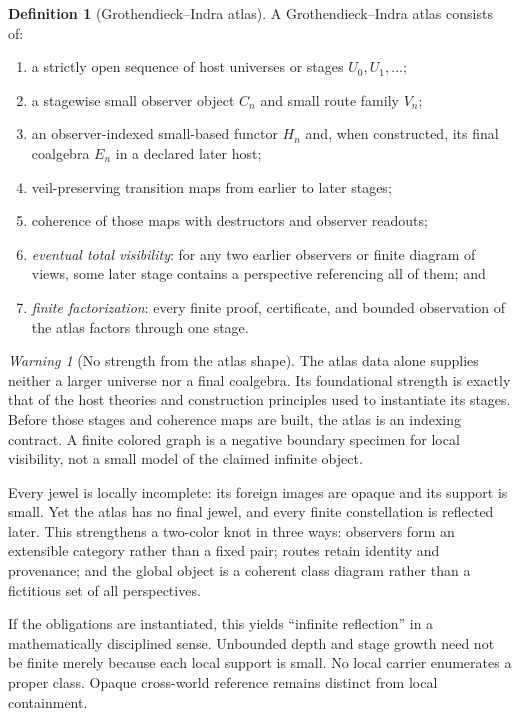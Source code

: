 \documentclass[11pt]{article}
\theoremstyle{definition}
\newtheorem{definition}[theorem]{Definition}
\theoremstyle{remark}
\newtheorem{warning}[theorem]{Warning}
\begin{document}
\begin{definition}[Grothendieck--Indra atlas]
A Grothendieck--Indra atlas consists of:
\begin{enumerate}[label=(\alph*)]
\item a strictly open sequence of host universes or stages $U_0,U_1,\ldots$;
\item a stagewise small observer object $C_n$ and small route family $V_n$;
\item an observer-indexed small-based functor $H_n$ and, when constructed, its
  final coalgebra $E_n$ in a declared later host;
\item veil-preserving transition maps from earlier to later stages;
\item coherence of those maps with destructors and observer readouts;
\item \emph{eventual total visibility}: for any two earlier observers or finite
  diagram of views, some later stage contains a perspective referencing all of
  them; and
\item \emph{finite factorization}: every finite proof, certificate, and bounded
  observation of the atlas factors through one stage.
\end{enumerate}
\end{definition}

\begin{warning}[No strength from the atlas shape]
The atlas data alone supplies neither a larger universe nor a final coalgebra.
Its foundational strength is exactly that of the host theories and construction
principles used to instantiate its stages.  Before those stages and coherence
maps are built, the atlas is an indexing contract.  A finite colored graph is a
negative boundary specimen for local visibility, not a small model of the
claimed infinite object.
\end{warning}

Every jewel is locally incomplete: its foreign images are opaque and its support
is small.  Yet the atlas has no final jewel, and every finite constellation is
reflected later.  This strengthens a two-color knot in three ways: observers form
an extensible category rather than a fixed pair; routes retain identity and
provenance; and the global object is a coherent class diagram rather than a
fictitious set of all perspectives.

If the obligations are instantiated, this yields ``infinite reflection'' in a
mathematically disciplined sense.  Unbounded depth and stage growth need not be
finite merely because each local support is small.  No local carrier enumerates
a proper class.  Opaque cross-world reference remains distinct from local
containment.
\end{document}
